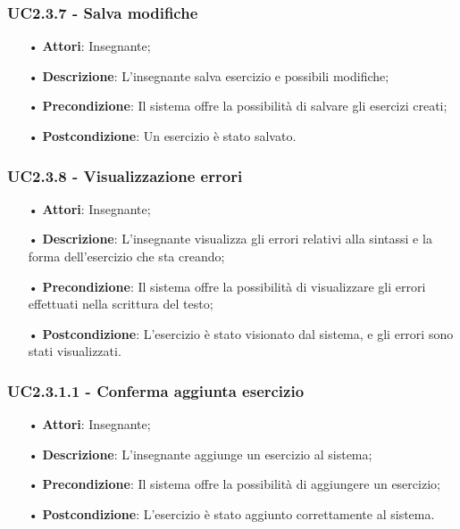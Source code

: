 \subsubsection{UC2.3.7 - Salva modifiche}
\begin{itemize}
	\item[•] \textbf{Attori}: Insegnante;
	\item[•] \textbf{Descrizione}: L'insegnante salva esercizio e possibili modifiche;
	\item[•] \textbf{Precondizione}: Il sistema offre la possibilità di salvare gli esercizi creati;
	\item[•] \textbf{Postcondizione}: Un esercizio è stato salvato.
\end{itemize}

\subsubsection{UC2.3.8 - Visualizzazione errori}
\begin{itemize}
	\item[•] \textbf{Attori}: Insegnante;
	\item[•] \textbf{Descrizione}: L'insegnante visualizza gli errori relativi alla sintassi e la forma dell’esercizio che sta creando;
	\item[•] \textbf{Precondizione}: Il sistema offre la possibilità di visualizzare gli errori effettuati nella scrittura del testo;
	\item[•] \textbf{Postcondizione}: L’esercizio è stato visionato dal sistema, e gli errori sono stati visualizzati.
\end{itemize}

\subsubsection{UC2.3.1.1 - Conferma aggiunta esercizio}
\begin{itemize}
	\item[•] \textbf{Attori}: Insegnante;
	\item[•] \textbf{Descrizione}: L'insegnante aggiunge un esercizio al sistema;
	\item[•] \textbf{Precondizione}: Il sistema offre la possibilità di aggiungere un esercizio;
	\item[•] \textbf{Postcondizione}: L’esercizio è stato aggiunto correttamente al sistema.
\end{itemize}


